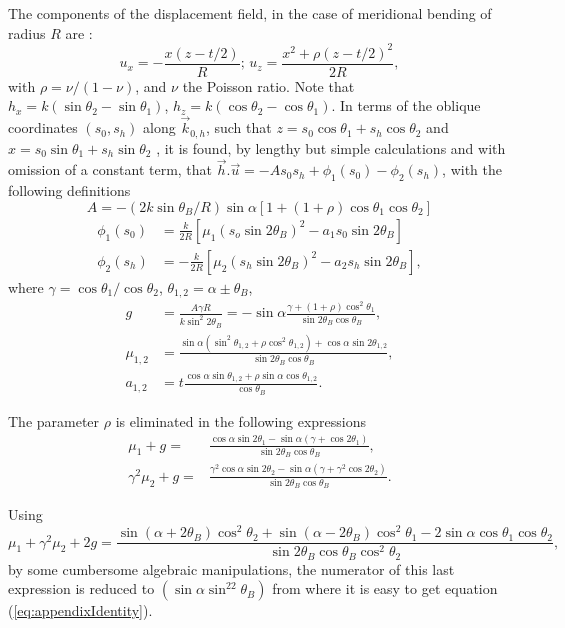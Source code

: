 \documentclass[preprint]{iucr}              %
\begin{document}
The components of the displacement field, in the case of meridional bending of radius $R$ are \cite{Nesterets}:
\begin{equation}
    u_x = -\frac{x(z-t/2)}{R}; \, u_z=\frac{x^2+\rho(z-t/2)^2}{2R},
\end{equation}
with $\rho=\nu/(1-\nu)$, and $\nu$ the Poisson ratio. 
Note that $h_x=k(\sin\theta_2-\sin\theta_1)$, $h_z=k(\cos\theta_2-\cos\theta_1)$.
In terms of the oblique coordinates $(s_0,s_h)$ along $\vec k_{0,h}$, such that $z=s_0\cos\theta_1 + s_h \cos\theta_2$ and $x=s_0 \sin\theta_1+s_h\sin\theta_2$ , 
it is found, by lengthy but simple calculations and with omission of a constant term, that $\vec h.\vec u=-A s_0 s_h + \phi_1(s_0) -\phi_2(s_h)$,  
with the following definitions
\begin{equation}
    A = -(2 k \sin\theta_B /R)\sin\alpha[1+(1+\rho)\cos\theta_1\cos\theta_2]
\end{equation}
\begin{align}
    \phi_1(s_0) &= \frac{k}{2R}[\mu_1(s_o\sin2\theta_B)^2-a_1 s_0\sin2\theta_B] \nonumber \\
    \phi_2(s_h) &= -\frac{k}{2R}[\mu_2(s_h\sin2\theta_B)^2-a_2 s_h\sin2\theta_B],
\end{align}
where $\gamma=\cos\theta_1/\cos\theta_2$, $\theta_{1,2}=\alpha\pm \theta_B$,
\begin{align}
   g &= \frac{A \gamma R}{k \sin^2 2\theta_B} = -\sin\alpha\frac{\gamma +(1+\rho)\cos^2\theta_1}{\sin2\theta_B\cos\theta_B}, \nonumber \\
   \mu_{1,2} &=\frac{\sin\alpha(\sin^2\theta_{1,2}+\rho\cos^2\theta_{1,2})+\cos\alpha\sin2\theta_{1,2}}{\sin2\theta_B\cos\theta_B}, \nonumber \\
   a_{1,2} &=t\frac{\cos\alpha\sin\theta_{1,2}+\rho\sin\alpha\cos\theta_{1,2}}{\cos\theta_B}. \nonumber
\end{align}

The parameter $\rho$ is eliminated in the following expressions 
\begin{align}
    \mu_1+g=&\frac{\cos\alpha\sin2\theta_1-\sin\alpha(\gamma+\cos2\theta_1)}{\sin2\theta_B\cos\theta_B},
    \\
    \gamma^2\mu_2+g=&\frac{\gamma^2\cos\alpha\sin2\theta_2-\sin\alpha(\gamma+\gamma^2\cos2\theta_2)}{\sin2\theta_B\cos\theta_B}.
\end{align}

Using
\begin{equation}
    \mu_1 + \gamma^2 \mu_2 + 2 g = \frac{
    \sin(\alpha+2 \theta_B)\cos^2\theta_2 + \sin(\alpha-2\theta_B) \cos^2\theta_1 - 2 \sin\alpha \cos\theta_1 \cos\theta_2
    }{
    \sin2\theta_B \cos\theta_B \cos^2\theta_2
    },
\end{equation}
by some cumbersome algebraic manipulations, the numerator of this last expression is reduced to $(\sin\alpha \sin^22\theta_B)$ from where it is easy to get equation (\ref{eq:appendixIdentity}).
\end{document}

